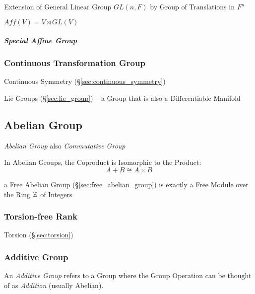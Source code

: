 \begin{itemize}
Extension of General Linear Group $GL(n,F)$ by Group of Translations in $F^n$

$Aff(V) = V \rtimes GL(V)$



\subparagraph{Special Affine Group}\label{sec:special_affine_group}\hfill



\subsubsection{Continuous Transformation Group}
\label{sec:continuous_transformation_group}

Continuous Symmetry (\S\ref{sec:continuous_symmetry})

Lie Groups (\S\ref{sec:lie_group}) -- a Group that is also a
Differentiable Manifold



\subsection{Abelian Group}\label{sec:abelian_group}

\emph{Abelian Group} also \emph{Commutative Group}

In Abelian Groups, the Coproduct is Isomorphic to the Product:
\[
  A + B \cong A \times B
\]

\fist a Free Abelian Group (\S\ref{sec:free_abelian_group}) is exactly a Free
Module over the Ring $\mathbb{Z}$ of Integers



\subsubsection{Torsion-free Rank}\label{sec:torsionfree_rank}

Torsion (\S\ref{sec:torsion})



\subsubsection{Additive Group}\label{sec:additive_group}

An \emph{Additive Group} refers to a Group where the Group Operation
can be thought of as \emph{Addition} (usually Abelian).




\end{itemize}
